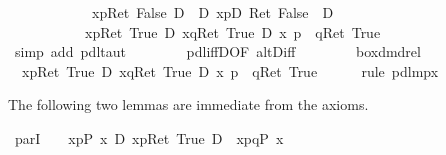 \begin{isabellebody}
\ \ \ \ \ \ \ \ \ \ {\isacharparenleft}\ {\isacharbrackleft}{\isacharhash}\ x{\isasymleftarrow}p{\isacharbrackright}{\isacharparenleft}Ret\ False{\isacharparenright}\ {\isasymlongleftrightarrow}\isactrlsub D\ \ {\isasymnot}\isactrlsub D\ {\isasymlangle}x{\isasymleftarrow}p{\isasymrangle}{\isacharparenleft}{\isasymnot}\isactrlsub D\ Ret\ False{\isacharparenright}\ {\isacharparenright}\ {\isasymlongrightarrow}\isactrlsub D\ \isanewline
\ \ \ \ \ \ \ \ \ \ \ {\isasymlangle}x{\isasymleftarrow}p{\isasymrangle}{\isacharparenleft}Ret\ True{\isacharparenright}\ {\isasymor}\isactrlsub D\ {\isasymlangle}x{\isasymleftarrow}q{\isasymrangle}{\isacharparenleft}Ret\ True{\isacharparenright}\ {\isasymlongrightarrow}\isactrlsub D\ {\isasymlangle}x{\isasymleftarrow}\ p\ {\isasymparallel}\ q{\isasymrangle}{\isacharparenleft}Ret\ True{\isacharparenright}{\isachardoublequote}\isanewline
\ \ \ \ \isamarkupfalse%
\ {\isacharparenleft}simp\ add{\isacharcolon}\ pdl{\isacharunderscore}taut{\isacharparenright}\isanewline
\ \ \isamarkupfalse%
\ \isanewline
\ \ \isamarkupfalse%
\ pdl{\isacharunderscore}iffD{}{\isacharbrackleft}OF\ altD{\isacharunderscore}iff{\isacharbrackright}\isanewline
\ \ \isamarkupfalse%
\ \isanewline
\ \ \isamarkupfalse%
\ box{\isacharunderscore}dmd{\isacharunderscore}rel\isanewline
\ \ \isamarkupfalse%
\isanewline
\ \ \isamarkupfalse%
\ {\isachardoublequote}{\isasymturnstile}\ {\isasymlangle}x{\isasymleftarrow}p{\isasymrangle}{\isacharparenleft}Ret\ True{\isacharparenright}\ {\isasymor}\isactrlsub D\ {\isasymlangle}x{\isasymleftarrow}q{\isasymrangle}{\isacharparenleft}Ret\ True{\isacharparenright}\ {\isasymlongrightarrow}\isactrlsub D\ {\isasymlangle}x{\isasymleftarrow}\ p\ {\isasymparallel}\ q{\isasymrangle}{\isacharparenleft}Ret\ True{\isacharparenright}{\isachardoublequote}\isanewline
\ \ \ \ \isamarkupfalse%
\ {\isacharparenleft}rule\ pdl{\isacharunderscore}mp{\isacharunderscore}{}x{\isacharparenright}\isanewline
\isamarkupfalse%
\isamarkupfalse%
%
\begin{isamarkuptext}%
The following two lemmas are immediate from the axioms.%
\end{isamarkuptext}%
\isamarkuptrue%
\ parI{}{\isacharcolon}\ {\isachardoublequote}{\isasymturnstile}\ \ {\isacharbrackleft}{\isacharhash}\ x{\isasymleftarrow}p{\isacharbrackright}{\isacharparenleft}P\ x{\isacharparenright}\ {\isasymand}\isactrlsub D\ {\isasymlangle}x{\isasymleftarrow}p{\isasymrangle}{\isacharparenleft}Ret\ True{\isacharparenright}\ {\isasymlongrightarrow}\isactrlsub D\ {\isacharbrackleft}{\isacharhash}\ x{\isasymleftarrow}p{\isasymparallel}q{\isacharbrackright}{\isacharparenleft}P\ x{\isacharparenright}{\isachardoublequote}\isamarkupfalse%

\end{isabellebody}
